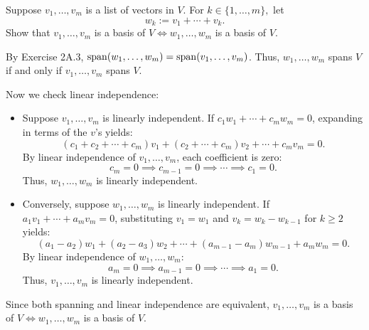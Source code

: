 \begin{xrcs}
  Suppose $v_1, \dots, v_m$ is a list of vectors in $V$. For $k \in \{1, \ldots, m\},$ let
  \begin{equation}
    w_k := v_1 + \cdots + v_k.
  \end{equation}
  Show that $v_1, \ldots, v_m$ is a basis of $V \iff w_1, \ldots, w_m$ is a basis of $V$.

  \begin{xprf}
    By Exercise 2A.3, $\operatorname{span} (w_1, \dots, w_m) = \operatorname{span} (v_1, \dots, v_m)$.
    Thus, $w_1, \dots, w_m$ spans $V$ if and only if $v_1, \dots, v_m$ spans $V$.

    Now we check linear independence:
    \begin{itemize}
      \item Suppose $v_1, \dots, v_m$ is linearly independent. If $c_1 w_1 + \cdots + c_m w_m = 0$, expanding in terms of the $v$'s yields:
      \[
        (c_1 + c_2 + \cdots + c_m) v_1 + (c_2 + \cdots + c_m) v_2 + \cdots + c_m v_m = 0.
      \]
      By linear independence of $v_1, \dots, v_m$, each coefficient is zero:
      \[
        c_m = 0 \implies c_{m-1} = 0 \implies \cdots \implies c_1 = 0.
      \]
      Thus, $w_1, \dots, w_m$ is linearly independent.

      \item Conversely, suppose $w_1, \dots, w_m$ is linearly independent. If $a_1 v_1 + \cdots + a_m v_m = 0$, substituting $v_1 = w_1$ and $v_k = w_k - w_{k-1}$ for $k \ge 2$ yields:
      \[
        (a_1 - a_2) w_1 + (a_2 - a_3) w_2 + \cdots + (a_{m-1} - a_m) w_{m-1} + a_m w_m = 0.
      \]
      By linear independence of $w_1, \dots, w_m$:
      \[
        a_m = 0 \implies a_{m-1} = 0 \implies \cdots \implies a_1 = 0.
      \]
      Thus, $v_1, \dots, v_m$ is linearly independent.
    \end{itemize}
    Since both spanning and linear independence are equivalent, $v_1, \dots, v_m$ is a basis of $V \iff w_1, \dots, w_m$ is a basis of $V$.
  \end{xprf}
\end{xrcs}
